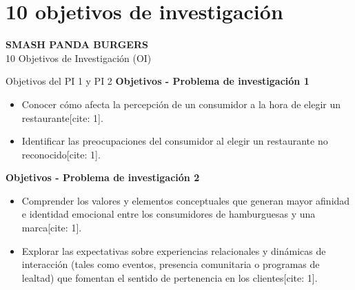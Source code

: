 \section{10 objetivos de investigación}

\begin{frame}{}
  \vspace{1.5cm}
  \centering
  \Huge \textbf{SMASH PANDA BURGERS} \\
  \vspace{0.5cm}
  \Large 10 Objetivos de Investigación (OI)
\end{frame}

\begin{frame}{Objetivos del PI 1 y PI 2}
  \vspace{1.5cm}
  \textbf{Objetivos - Problema de investigación 1}
  \begin{itemize}
    \item Conocer cómo afecta la percepción de un consumidor a la hora de elegir un restaurante[cite: 1].
    \item Identificar las preocupaciones del consumidor al elegir un restaurante no reconocido[cite: 1].
  \end{itemize}

  \vspace{0.5cm}
  \textbf{Objetivos - Problema de investigación 2}
  \begin{itemize}
    \item Comprender los valores y elementos conceptuales que generan mayor afinidad e identidad emocional entre los consumidores de hamburguesas y una marca[cite: 1].
    \item Explorar las expectativas sobre experiencias relacionales y dinámicas de interacción (tales como eventos, presencia comunitaria o programas de lealtad) que fomentan el sentido de pertenencia en los clientes[cite: 1].
  \end{itemize}
\end{frame}

